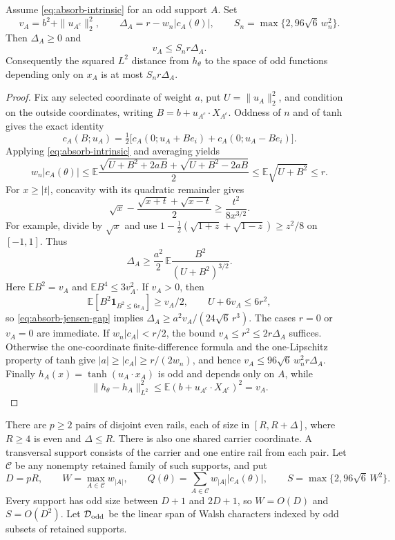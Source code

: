 \begin{lemma}\label{lem:absorb-support}
Assume \eqref{eq:absorb-intrinsic} for an odd support $A$.  Set
\[
 v_A=b^2+\|u_{A^c}\|_2^2,
 \qquad \Delta_A=r-w_n|c_A(\theta)|,
 \qquad S_n=\max\{2,96\sqrt6\,w_n^2\}.
\]
Then $\Delta_A\geq0$ and
\begin{equation}\label{eq:absorb-support}
 v_A\leq S_n r\Delta_A.
\end{equation}
Consequently the squared $L^2$ distance from $h_\theta$ to the space of odd
functions depending only on $x_A$ is at most $S_n r\Delta_A$.
\end{lemma}
\begin{proof}
Fix any selected coordinate of weight $a$, put $U=\|u_A\|_2^2$, and condition
on the outside coordinates, writing $B=b+u_{A^c}\cdot X_{A^c}$.  Oddness of
$n$ and of tanh gives the exact identity
\[
 c_A(B;u_A)=\tfrac12\bigl[c_A(0;u_A+B e_i)
                                  +c_A(0;u_A-B e_i)\bigr].
\]
Applying \eqref{eq:absorb-intrinsic} and averaging yields
\[
 w_n|c_A(\theta)|\leq
 \mathbb E\frac{\sqrt{U+B^2+2aB}+\sqrt{U+B^2-2aB}}2
 \leq\mathbb E\sqrt{U+B^2}\leq r.
\]
For $x\geq |t|$, concavity with its quadratic remainder gives
\[
 \sqrt{x}-\frac{\sqrt{x+t}+\sqrt{x-t}}2
 \geq\frac{t^2}{8x^{3/2}}.
\]
For example, divide by $\sqrt x$ and use
$1-\tfrac12(\sqrt{1+z}+\sqrt{1-z})\geq z^2/8$ on $[-1,1]$.
Thus
\begin{equation}\label{eq:absorb-jensen-gap}
 \Delta_A\geq\frac{a^2}{2}\,
       \mathbb E\frac{B^2}{(U+B^2)^{3/2}}.
\end{equation}
Here $\mathbb EB^2=v_A$ and $\mathbb EB^4\leq3v_A^2$.  If $v_A>0$, then
\[
 \mathbb E[B^2\mathbf1_{B^2\leq6v_A}]\geq v_A/2,
 \qquad U+6v_A\leq6r^2,
\]
so \eqref{eq:absorb-jensen-gap} implies
$\Delta_A\geq a^2v_A/(24\sqrt6\,r^3)$.
The cases $r=0$ or $v_A=0$ are immediate.
If $w_n|c_A|<r/2$, the bound $v_A\leq r^2\leq2r\Delta_A$ suffices.
Otherwise the one-coordinate finite-difference formula and the
one-Lipschitz property of tanh give
$|a|\geq|c_A|\geq r/(2w_n)$, and hence
$v_A\leq96\sqrt6\,w_n^2r\Delta_A$.
Finally $h_A(x)=\tanh(u_A\cdot x_A)$ is odd and depends only on $A$, while
\[
 \|h_\theta-h_A\|_{L^2}^2
 \leq\mathbb E(b+u_{A^c}\cdot X_{A^c})^2=v_A.
\]
\end{proof}

There are $p\geq2$ pairs of disjoint even rails, each of size in
$[R,R+\Delta]$, where $R\geq4$ is even and $\Delta\leq R$.
There is also one shared carrier coordinate.  A transversal support consists
of the carrier and one entire rail from each pair.  Let $\mathcal C$ be any
nonempty retained family of such supports, and put
\[
 D=pR,\qquad W=\max_{A\in\mathcal C}w_{|A|},\qquad
 Q(\theta)=\sum_{A\in\mathcal C}w_{|A|}|c_A(\theta)|,
 \qquad S=\max\{2,96\sqrt6\,W^2\}.
\]
Every support has odd size between $D+1$ and $2D+1$, so $W=O(D)$ and
$S=O(D^2)$.  Let $\mathcal D_{\rm odd}$ be the linear span of Walsh
characters indexed by odd subsets of retained supports.

